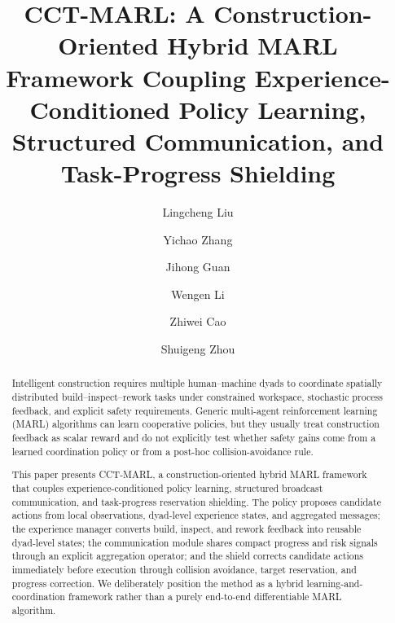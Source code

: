 \documentclass[preprint,12pt]{elsarticle}
\begin{document}
\begin{frontmatter}

\title{CCT-MARL: A Construction-Oriented Hybrid MARL Framework Coupling Experience-Conditioned Policy Learning, Structured Communication, and Task-Progress Shielding}

\author[inst1]{Lingcheng Liu}
\author[inst1]{Yichao Zhang}
\author[inst1]{Jihong Guan}
\author[inst1]{Wengen Li}
\author[inst1]{Zhiwei Cao}
\author[inst2]{Shuigeng Zhou}
\address[inst1]{School of Computer Science and Technology, Tongji University, Shanghai, China}
\address[inst2]{School of Computer Science, Fudan University, Shanghai, China}


\begin{abstract}
Intelligent construction requires multiple human--machine dyads to coordinate spatially distributed build--inspect--rework tasks under constrained workspace, stochastic process feedback, and explicit safety requirements. Generic multi-agent reinforcement learning (MARL) algorithms can learn cooperative policies, but they usually treat construction feedback as scalar reward and do not explicitly test whether safety gains come from a learned coordination policy or from a post-hoc collision-avoidance rule.

This paper presents CCT-MARL, a construction-oriented hybrid MARL framework that couples experience-conditioned policy learning, structured broadcast communication, and task-progress reservation shielding. The policy proposes candidate actions from local observations, dyad-level experience states, and aggregated messages; the experience manager converts build, inspect, and rework feedback into reusable dyad-level states; the communication module shares compact progress and risk signals through an explicit aggregation operator; and the shield corrects candidate actions immediately before execution through collision avoidance, target reservation, and progress correction. We deliberately position the method as a hybrid learning-and-coordination framework rather than a purely end-to-end differentiable MARL algorithm.


\end{abstract}
\end{frontmatter}
\end{document}
